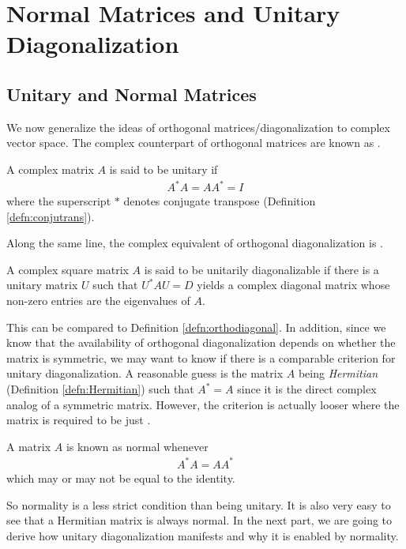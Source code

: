 \section{Normal Matrices and Unitary Diagonalization}

\subsection{Unitary and Normal Matrices} 
We now generalize the ideas of orthogonal matrices/diagonalization to complex vector space. The complex counterpart of orthogonal matrices are known as .
\begin{defn}
\label{defn:unitary}
A complex matrix $A$ is said to be unitary if
\begin{align*}
A^*A = AA^* = I
\end{align*}
where the superscript $*$ denotes conjugate transpose (Definition \ref{defn:conjutrans}).
\end{defn}
Along the same line, the complex equivalent of orthogonal diagonalization is .
\begin{defn}
\label{defn:unitarydiag}
A complex square matrix $A$ is said to be unitarily diagonalizable if there is a unitary matrix $U$ such that $U^* AU = D$ yields a complex diagonal matrix whose non-zero entries are the eigenvalues of $A$.
\end{defn}
This can be compared to Definition \ref{defn:orthodiagonal}. In addition, since we know that the availability of orthogonal diagonalization depends on whether the matrix is symmetric, we may want to know if there is a comparable criterion for unitary diagonalization. A reasonable guess is the matrix $A$ being \textit{Hermitian} (Definition \ref{defn:Hermitian}) such that $A^* = A$ since it is the direct complex analog of a symmetric matrix. However, the criterion is actually looser where the matrix is required to be just .
\begin{defn}
A matrix $A$ is known as normal whenever
\begin{align*}
A^*A = AA^*    
\end{align*}
which may or may not be equal to the identity.
\end{defn}
So normality is a less strict condition than being unitary. It is also very easy to see that a Hermitian matrix is always normal. In the next part, we are going to derive how unitary diagonalization manifests and why it is enabled by normality.


